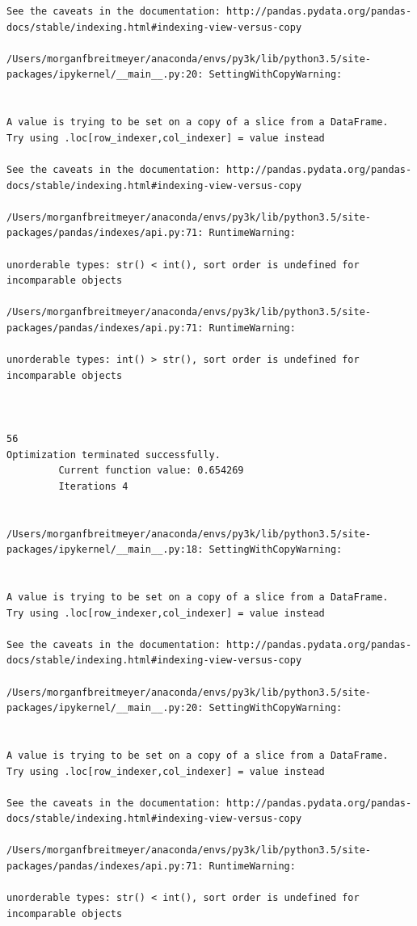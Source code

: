 \begin{lstlisting}
See the caveats in the documentation: http://pandas.pydata.org/pandas-docs/stable/indexing.html#indexing-view-versus-copy

/Users/morganfbreitmeyer/anaconda/envs/py3k/lib/python3.5/site-packages/ipykernel/__main__.py:20: SettingWithCopyWarning:


A value is trying to be set on a copy of a slice from a DataFrame.
Try using .loc[row_indexer,col_indexer] = value instead

See the caveats in the documentation: http://pandas.pydata.org/pandas-docs/stable/indexing.html#indexing-view-versus-copy

/Users/morganfbreitmeyer/anaconda/envs/py3k/lib/python3.5/site-packages/pandas/indexes/api.py:71: RuntimeWarning:

unorderable types: str() < int(), sort order is undefined for incomparable objects

/Users/morganfbreitmeyer/anaconda/envs/py3k/lib/python3.5/site-packages/pandas/indexes/api.py:71: RuntimeWarning:

unorderable types: int() > str(), sort order is undefined for incomparable objects



56
Optimization terminated successfully.
         Current function value: 0.654269
         Iterations 4


/Users/morganfbreitmeyer/anaconda/envs/py3k/lib/python3.5/site-packages/ipykernel/__main__.py:18: SettingWithCopyWarning:


A value is trying to be set on a copy of a slice from a DataFrame.
Try using .loc[row_indexer,col_indexer] = value instead

See the caveats in the documentation: http://pandas.pydata.org/pandas-docs/stable/indexing.html#indexing-view-versus-copy

/Users/morganfbreitmeyer/anaconda/envs/py3k/lib/python3.5/site-packages/ipykernel/__main__.py:20: SettingWithCopyWarning:


A value is trying to be set on a copy of a slice from a DataFrame.
Try using .loc[row_indexer,col_indexer] = value instead

See the caveats in the documentation: http://pandas.pydata.org/pandas-docs/stable/indexing.html#indexing-view-versus-copy

/Users/morganfbreitmeyer/anaconda/envs/py3k/lib/python3.5/site-packages/pandas/indexes/api.py:71: RuntimeWarning:

unorderable types: str() < int(), sort order is undefined for incomparable objects


\end{lstlisting}
